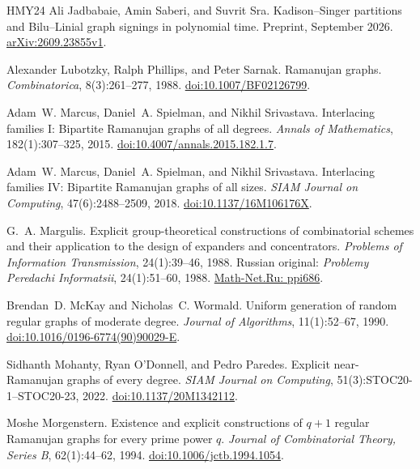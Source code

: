 \begin{thebibliography}{HMY24}
Ali Jadbabaie, Amin Saberi, and Suvrit Sra.
\newblock Kadison--Singer partitions and Bilu--Linial graph signings
  in polynomial time.
\newblock Preprint, September 2026.
\newblock \href{https://arxiv.org/abs/2609.23855v1}{arXiv:2609.23855v1}.

Alexander Lubotzky, Ralph Phillips, and Peter Sarnak.
\newblock Ramanujan graphs.
\newblock \emph{Combinatorica}, 8(3):261--277, 1988.
\newblock \href{https://doi.org/10.1007/BF02126799}{doi:10.1007/BF02126799}.

Adam~W. Marcus, Daniel~A. Spielman, and Nikhil Srivastava.
\newblock Interlacing families I: Bipartite Ramanujan graphs of all degrees.
\newblock \emph{Annals of Mathematics}, 182(1):307--325, 2015.
\newblock \href{https://doi.org/10.4007/annals.2015.182.1.7}{doi:10.4007/annals.2015.182.1.7}.

Adam~W. Marcus, Daniel~A. Spielman, and Nikhil Srivastava.
\newblock Interlacing families IV: Bipartite Ramanujan graphs of all sizes.
\newblock \emph{SIAM Journal on Computing}, 47(6):2488--2509, 2018.
\newblock \href{https://doi.org/10.1137/16M106176X}{doi:10.1137/16M106176X}.

G.~A. Margulis.
\newblock Explicit group-theoretical constructions of combinatorial schemes
  and their application to the design of expanders and concentrators.
\newblock \emph{Problems of Information Transmission}, 24(1):39--46, 1988.
\newblock Russian original: \emph{Problemy Peredachi Informatsii},
  24(1):51--60, 1988.
\newblock \href{https://www.mathnet.ru/eng/ppi686}{Math-Net.Ru: ppi686}.

Brendan~D. McKay and Nicholas~C. Wormald.
\newblock Uniform generation of random regular graphs of moderate degree.
\newblock \emph{Journal of Algorithms}, 11(1):52--67, 1990.
\newblock \href{https://doi.org/10.1016/0196-6774(90)90029-E}{doi:10.1016/0196-6774(90)90029-E}.

Sidhanth Mohanty, Ryan O'Donnell, and Pedro Paredes.
\newblock Explicit near-Ramanujan graphs of every degree.
\newblock \emph{SIAM Journal on Computing}, 51(3):STOC20-1--STOC20-23, 2022.
\newblock \href{https://doi.org/10.1137/20M1342112}{doi:10.1137/20M1342112}.

Moshe Morgenstern.
\newblock Existence and explicit constructions of $q+1$ regular Ramanujan
  graphs for every prime power $q$.
\newblock \emph{Journal of Combinatorial Theory, Series B}, 62(1):44--62, 1994.
\newblock \href{https://doi.org/10.1006/jctb.1994.1054}{doi:10.1006/jctb.1994.1054}.


\end{thebibliography}
